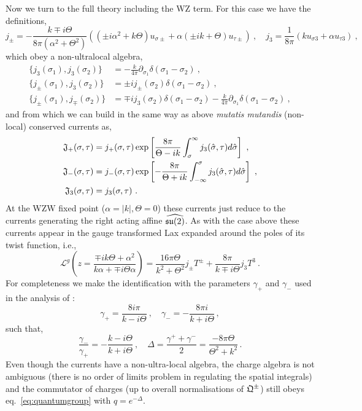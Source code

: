 \documentclass[12pt]{article}
\def\Lax{{\mathscr L}}
\def\ee{\boldsymbol{e}}
\def\be{\begin{equation}}
\def\ee{\end{equation}}
\begin{document}
  Now we turn to the full theory including the WZ  term.  For this case we have the definitions, 
  \be
  j_\pm = - \frac{k\mp i \Theta}{8 \pi ( \alpha^2 + \Theta^2 ) } \left(( \pm i \alpha^2 + k \Theta ) u_{\sigma \pm} + \alpha(\pm i k +\Theta )u_{\tau \pm}  \right)  \ , \quad j_3 = \frac{1}{8\pi} \left(k  u_{ \sigma 3} + \alpha   u_{ \tau 3}  \right) \ ,
  \ee
  which obey a non-ultralocal algebra, 
  \be
\begin{aligned}
\{ j_3 (\sigma_1) , j_3(\sigma_2) \} &=   - \frac{k}{4\pi} \partial_{\sigma_1} \delta(\sigma_1- \sigma_2)  \ , \\
\{ j_\pm (\sigma_1) , j_3(\sigma_2) \} &= \pm i j_\pm (\sigma_2) \delta(\sigma_1- \sigma_2) \ ,  \\ 
\{ j_\pm (\sigma_1) , j_\mp(\sigma_2) \} &= \mp i  j_3(\sigma_2) \delta(\sigma_1- \sigma_2)- \frac{k}{4\pi} \partial_{\sigma_1} \delta(\sigma_1- \sigma_2)  \ , 
 \end{aligned}
\ee
and from which we can build in the same way as above {\em mutatis mutandis}  (non-local) conserved currents as,
  \be
\begin{aligned}
\frak{J}_+(\sigma ,\tau) &= j_+(\sigma ,\tau) \exp\left[ \frac{8 \pi}{\Theta - i k } \int_{\sigma}^\infty  j_3 (\hat{\sigma}  ,\tau)  d\hat{\sigma}  \right] \ , \\  
\frak{J}_-(\sigma ,\tau) &= j_-(\sigma ,\tau) \exp\left[  -\frac{8 \pi}{\Theta + i k }  \int_{-\infty}^\sigma  j_3 (\hat{\sigma}  ,\tau)  d\hat{\sigma}  \right] \ , \\  
\frak{J}_3(\sigma ,\tau) &= j_3(\sigma ,\tau) \ . 
 \end{aligned}
\ee 
At the WZW fixed point ($\alpha =|k| , \Theta= 0$) these currents just reduce to the currents generating the right acting affine $\widehat{\frak{su}(2)}$.  As with the case above these currents appear in the gauge transformed Lax expanded around the poles of its twist function, i.e., 
\be
\Lax^g\left(z= \frac{\mp i k \Theta + \alpha^2 }{ k \alpha +\mp i \Theta \alpha }   \right)   =  \frac{16\pi  \Theta }{k^2 + \Theta^2}   j_\pm T^\pm    + \frac{8 \pi}{k\mp i \Theta } j_3 T^3 \ .
\ee
 For completeness we make the identification with the parameters $\gamma_+ $ and $\gamma_-$ used in the analysis of    \cite{Kawaguchi:2013gma}:
  \be
 \gamma_+ = \frac{ 8i  \pi}{ k - i \Theta  }  \ , \quad  \gamma_- = - \frac{ 8 \pi i }{ k + i \Theta  } \,,
  \ee
  such that, 
   \be
\frac{ \gamma_- }{ \gamma_+ } =- \frac{ k - i \Theta   }{k + i  \Theta   }  \ , \quad  \Delta = \frac{\gamma^+ + \gamma^- }{2} = \frac{- 8 \pi \Theta}{\Theta^2 + k^2}\,.
  \ee
Even though the currents have a non-ultra-local algebra, the charge algebra is not ambiguous   \cite{Kawaguchi:2013gma}  (there is no order of limits problem in regulating the spatial integrals) and the commutator of charges (up to overall normalisations of $\frak{Q}^\pm$) still obeys eq.~\eqref{eq:quantumgroup}   with $q= e^{-\Delta}$. 
\end{document}
